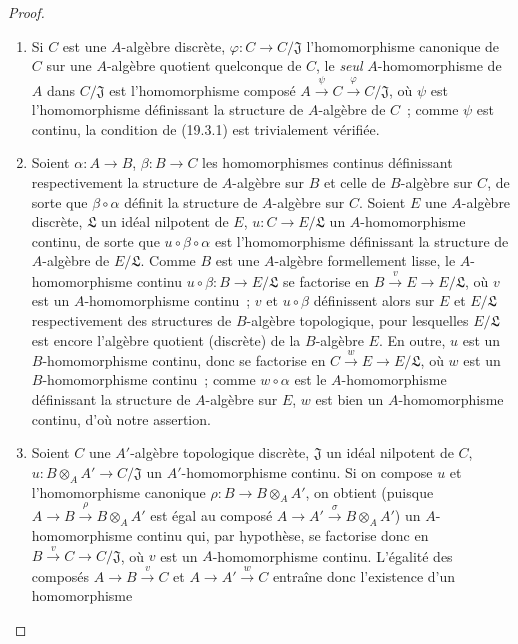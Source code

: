 \begin{proof}
\begin{enumerate}
  \item[(i)] Si $C$ est une $A$-algèbre discrète,
  $\varphi:C\to C/\mathfrak J$ l'homomorphisme canonique de $C$ sur une
  $A$-algèbre quotient quelconque de $C$, le \emph{seul} $A$-homomorphisme
  de $A$ dans $C/\mathfrak J$ est l'homomorphisme composé
  $A\xrightarrow{\psi}C\xrightarrow{\varphi}C/\mathfrak J$, où
  $\psi$ est l'homomorphisme définissant la structure de $A$-algèbre de
  $C$~; comme $\psi$ est continu, la condition de (19.3.1) est trivialement
  vérifiée.
  \item[(ii)] Soient $\alpha:A\to B$, $\beta:B\to C$ les homomorphismes
  continus définissant respectivement la structure de $A$-algèbre sur $B$ et
  celle de $B$-algèbre sur $C$, de sorte que $\beta\circ\alpha$ définit la
  structure de $A$-algèbre sur $C$. Soient $E$ une $A$-algèbre discrète,
  $\mathfrak L$ un idéal nilpotent de $E$, $u:C\to E/\mathfrak L$ un
  $A$-homomorphisme continu, de sorte que $u\circ\beta\circ\alpha$ est
  l'homomorphisme définissant la structure de $A$-algèbre de
  $E/\mathfrak L$. Comme $B$ est une $A$-algèbre formellement lisse, le
  $A$-homomorphisme continu $u\circ\beta:B\to E/\mathfrak L$ se
  factorise en $B\xrightarrow{v}E\to E/\mathfrak L$, où $v$ est un
  $A$-homomorphisme continu~; $v$ et $u\circ\beta$ définissent alors sur
  $E$ et $E/\mathfrak L$ respectivement des structures de $B$-algèbre
  topologique, pour lesquelles $E/\mathfrak L$ est encore l'algèbre quotient
  (discrète) de la $B$-algèbre $E$. En outre, $u$ est un $B$-homomorphisme
  continu, donc se factorise en $C\xrightarrow{w}E\to E/\mathfrak L$,
  où $w$ est un $B$-homomorphisme continu~; comme
  $w\circ\alpha$ est le $A$-homomorphisme définissant la structure de
  $A$-algèbre sur $E$, $w$ est bien un $A$-homomorphisme continu, d'où notre
  assertion.
  \item[(iii)] Soient $C$ une $A'$-algèbre topologique discrète,
  $\mathfrak J$ un idéal nilpotent de $C$,
  $u:B\otimes_A A'\to C/\mathfrak J$ un $A'$-homomorphisme continu. Si on
  compose $u$ et l'homomorphisme canonique
  $\rho:B\to B\otimes_A A'$, on obtient (puisque
  $A\to B\xrightarrow{\rho}B\otimes_A A'$ est égal au composé
  $A\to A'\xrightarrow{\sigma}B\otimes_A A'$) un $A$-homomorphisme
  continu qui, par hypothèse, se factorise donc en
  $B\xrightarrow{v}C\to C/\mathfrak J$, où $v$ est un $A$-homomorphisme
  continu. L'égalité des composés $A\to B\xrightarrow{v}C$ et
  $A\to A'\xrightarrow{w}C$ entraîne donc l'existence d'un homomorphisme

\end{enumerate}
\end{proof}
